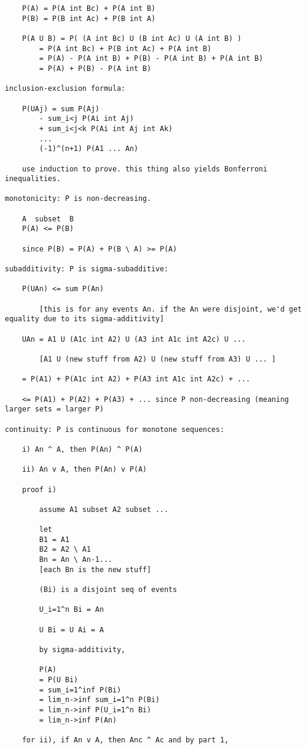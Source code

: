 \documentclass{article}
\begin{document}
\begin{flushleft}
\begin{verbatim}
	P(A) = P(A int Bc) + P(A int B)
	P(B) = P(B int Ac) + P(B int A)
	
	P(A U B) = P( (A int Bc) U (B int Ac) U (A int B) )
		= P(A int Bc) + P(B int Ac) + P(A int B)
		= P(A) - P(A int B) + P(B) - P(A int B) + P(A int B)
		= P(A) + P(B) - P(A int B)
		
inclusion-exclusion formula:

	P(UAj) = sum P(Aj) 
		- sum_i<j P(Ai int Aj)
		+ sum_i<j<k P(Ai int Aj int Ak)
		...
		(-1)^(n+1) P(A1 ... An)
		
	use induction to prove. this thing also yields Bonferroni inequalities. 
	
monotonicity: P is non-decreasing.

	A  subset  B
	P(A) <= P(B)
	
	since P(B) = P(A) + P(B \ A) >= P(A)
	
subadditivity: P is sigma-subadditive:

	P(UAn) <= sum P(An)
	
		[this is for any events An. if the An were disjoint, we'd get equality due to its sigma-additivity]
	
	UAn = A1 U (A1c int A2) U (A3 int A1c int A2c) U ... 
	
		[A1 U (new stuff from A2) U (new stuff from A3) U ... ]
		
	= P(A1) + P(A1c int A2) + P(A3 int A1c int A2c) + ... 
	
	<= P(A1) + P(A2) + P(A3) + ... since P non-decreasing (meaning larger sets = larger P)
	
continuity: P is continuous for monotone sequences:

	i) An ^ A, then P(An) ^ P(A)
	
	ii) An v A, then P(An) v P(A)
	
	proof i)
	
		assume A1 subset A2 subset ... 
		
		let 
		B1 = A1
		B2 = A2 \ A1
		Bn = An \ An-1...
		[each Bn is the new stuff]
		
		(Bi) is a disjoint seq of events
		
		U_i=1^n Bi = An
		
		U Bi = U Ai = A
		
		by sigma-additivity, 
		
		P(A) 
		= P(U Bi) 
		= sum_i=1^inf P(Bi)  
		= lim_n->inf sum_i=1^n P(Bi)
		= lim_n->inf P(U_i=1^n Bi)
		= lim_n->inf P(An)
		
	for ii), if An v A, then Anc ^ Ac and by part 1,
	

\end{verbatim}
\end{flushleft}
\end{document}
